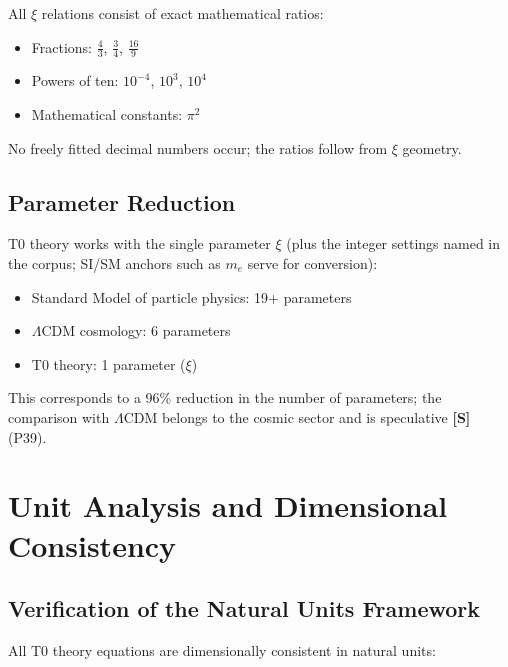 	\begin{important}
		All $\xi$ relations consist of exact mathematical ratios:
		\begin{itemize}
			\item Fractions: $\frac{4}{3}$, $\frac{3}{4}$, $\frac{16}{9}$
			\item Powers of ten: $10^{-4}$, $10^3$, $10^4$
			\item Mathematical constants: $\pi^2$
		\end{itemize}
		No freely fitted decimal numbers occur; the ratios follow from $\xi$ geometry.
	\end{important}
	
	\subsection{Parameter Reduction}
	
	\begin{important}
		T0 theory works with the single parameter $\xi$ (plus the integer settings named in the corpus; SI/SM anchors such as $m_e$ serve for conversion):
		\begin{itemize}
			\item Standard Model of particle physics: 19+ parameters
			\item $\Lambda$CDM cosmology: 6 parameters
			\item T0 theory: 1 parameter ($\xi$)
		\end{itemize}
		This corresponds to a 96\% reduction in the number of parameters; the comparison with $\Lambda$CDM belongs to the cosmic sector and is speculative \textbf{[S]} (P39).
	\end{important}
	
	\section{Unit Analysis and Dimensional Consistency}
	
	\subsection{Verification of the Natural Units Framework}
	
	All T0 theory equations are dimensionally consistent in natural units:
	
